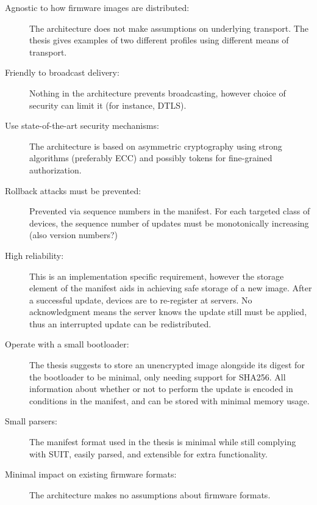 \documentclass[0-thesis.tex]{subfiles}
\begin{document}
\begin{description}
    \item[Agnostic to how firmware images are distributed:]
        The architecture does not make assumptions on underlying transport. The thesis
        gives examples of two different profiles using different means of transport.

    \item[Friendly to broadcast delivery:]
        Nothing in the architecture prevents broadcasting, however choice of security can
        limit it (for instance, DTLS).

    \item[Use state-of-the-art security mechanisms:]
        The architecture is based on asymmetric cryptography using strong algorithms
        (preferably ECC) and possibly tokens for fine-grained authorization. 

    \item[Rollback attacks must be prevented:]
        Prevented via sequence numbers in the manifest. For each targeted class of
        devices, the sequence number of updates must be monotonically increasing (also
        version numbers?)

    \item[High reliability:]
        This is an implementation specific requirement, however the storage element of the
        manifest aids in achieving safe storage of a new image. After a successful update,
        devices are to re-register at servers. No acknowledgment means the server knows
        the update still must be applied, thus an interrupted update can be redistributed.

    \item[Operate with a small bootloader:]
        The thesis suggests to store an unencrypted image alongside its digest for the
        bootloader to be minimal, only needing support for SHA256. All information about
        whether or not to perform the update is encoded in conditions in the manifest, and
        can be stored with minimal memory usage.

    \item[Small parsers:]
        The manifest format used in the thesis is minimal while still complying with SUIT,
        easily parsed, and extensible for extra functionality.

    \item[Minimal impact on existing firmware formats:]
        The architecture makes no assumptions about firmware formats.


\end{description}
\end{document}

